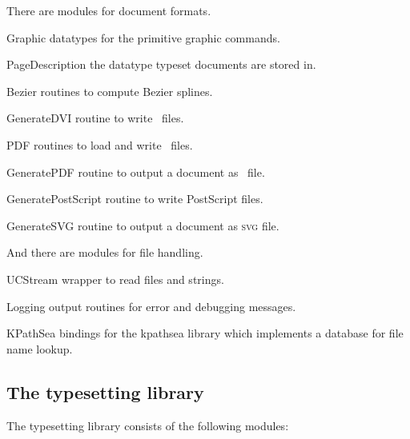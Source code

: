 There are modules for document formats.
\begin{description}
\item{\textsf{\red Graphic}}%
  datatypes for the primitive graphic commands.
\item{\textsf{\red PageDescription}}%
  the datatype typeset documents are stored in.
\item{\textsf{\red Bezier}}%
  routines to compute Bezier splines.
\item{\textsf{\red GenerateDVI}}%
  routine to write \dvi\ files.
\item{\textsf{\red PDF}}%
  routines to load and write \pdf\ files.
\item{\textsf{\red GeneratePDF}}%
  routine to output a document as \pdf\ file.
\item{\textsf{\red GeneratePostScript}}%
  routine to write PostScript files.
\item{\textsf{\red GenerateSVG}}%
  routine to output a document as \textsc{svg} file.
\end{description}
And there are modules for file handling.
\begin{description}
%
\item{\textsf{\red UCStream}}%
  wrapper to read files and strings.
\item{\textsf{\red Logging}}%
  output routines for error and debugging messages.
\item{\textsf{\red KPathSea}}%
  bindings for the kpathsea library which implements a da\-ta\-base for file name lookup.
\end{description}


\subsection{The typesetting library}   %

The typesetting library consists of the following modules\?:

